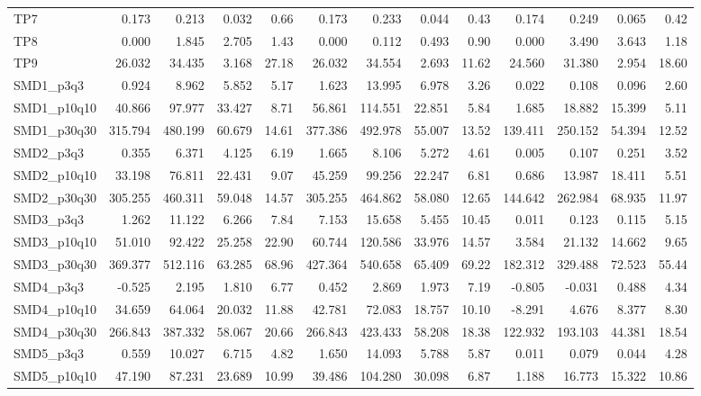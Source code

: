 \begin{longtable}{lrrrrrrrrrrrr}
TP7 & 0.173 & 0.213 & 0.032 & 0.66 & 0.173 & 0.233 & 0.044 & 0.43 & 0.174 & 0.249 & 0.065 & 0.42 \\
TP8 & 0.000 & 1.845 & 2.705 & 1.43 & 0.000 & 0.112 & 0.493 & 0.90 & 0.000 & 3.490 & 3.643 & 1.18 \\
TP9 & 26.032 & 34.435 & 3.168 & 27.18 & 26.032 & 34.554 & 2.693 & 11.62 & 24.560 & 31.380 & 2.954 & 18.60 \\
SMD1\_p3q3 & 0.924 & 8.962 & 5.852 & 5.17 & 1.623 & 13.995 & 6.978 & 3.26 & 0.022 & 0.108 & 0.096 & 2.60 \\
SMD1\_p10q10 & 40.866 & 97.977 & 33.427 & 8.71 & 56.861 & 114.551 & 22.851 & 5.84 & 1.685 & 18.882 & 15.399 & 5.11 \\
SMD1\_p30q30 & 315.794 & 480.199 & 60.679 & 14.61 & 377.386 & 492.978 & 55.007 & 13.52 & 139.411 & 250.152 & 54.394 & 12.52 \\
SMD2\_p3q3 & 0.355 & 6.371 & 4.125 & 6.19 & 1.665 & 8.106 & 5.272 & 4.61 & 0.005 & 0.107 & 0.251 & 3.52 \\
SMD2\_p10q10 & 33.198 & 76.811 & 22.431 & 9.07 & 45.259 & 99.256 & 22.247 & 6.81 & 0.686 & 13.987 & 18.411 & 5.51 \\
SMD2\_p30q30 & 305.255 & 460.311 & 59.048 & 14.57 & 305.255 & 464.862 & 58.080 & 12.65 & 144.642 & 262.984 & 68.935 & 11.97 \\
SMD3\_p3q3 & 1.262 & 11.122 & 6.266 & 7.84 & 7.153 & 15.658 & 5.455 & 10.45 & 0.011 & 0.123 & 0.115 & 5.15 \\
SMD3\_p10q10 & 51.010 & 92.422 & 25.258 & 22.90 & 60.744 & 120.586 & 33.976 & 14.57 & 3.584 & 21.132 & 14.662 & 9.65 \\
SMD3\_p30q30 & 369.377 & 512.116 & 63.285 & 68.96 & 427.364 & 540.658 & 65.409 & 69.22 & 182.312 & 329.488 & 72.523 & 55.44 \\
SMD4\_p3q3 & -0.525 & 2.195 & 1.810 & 6.77 & 0.452 & 2.869 & 1.973 & 7.19 & -0.805 & -0.031 & 0.488 & 4.34 \\
SMD4\_p10q10 & 34.659 & 64.064 & 20.032 & 11.88 & 42.781 & 72.083 & 18.757 & 10.10 & -8.291 & 4.676 & 8.377 & 8.30 \\
SMD4\_p30q30 & 266.843 & 387.332 & 58.067 & 20.66 & 266.843 & 423.433 & 58.208 & 18.38 & 122.932 & 193.103 & 44.381 & 18.54 \\
SMD5\_p3q3 & 0.559 & 10.027 & 6.715 & 4.82 & 1.650 & 14.093 & 5.788 & 5.87 & 0.011 & 0.079 & 0.044 & 4.28 \\
SMD5\_p10q10 & 47.190 & 87.231 & 23.689 & 10.99 & 39.486 & 104.280 & 30.098 & 6.87 & 1.188 & 16.773 & 15.322 & 10.86 \\

\end{longtable}
